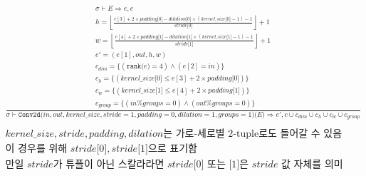 \documentclass{article}
\newcommand{\x}{\times}
\newcommand{\rem}{\mtt{\%}}
\newcommand{\Rar}{\Rightarrow}
\newcommand{\mtt}[1]{\mathtt{#1}}
\newcommand{\op}[2]{\mtt{#1(}#2\mtt{)}}
\newcommand{\module}[3]{\mtt{#1(}#2\mtt{)(}#3\mtt{)}}
\newcommand{\ind}[1]{\mtt{[}#1\mtt{]}}
\begin{document}
\begin{align*}
  \frac
  {
    \begin{array}{l}
      \sigma \vdash E \Rar e, c \\
      h = \left\lfloor \frac{e[3] + 2 \x padding \ind{0} - dilation \ind{0}
        \x (kernel\_size \ind{0} - 1) - 1}{stride \ind{0}} \right\rfloor + 1 \\
      w = \left\lfloor \frac{e[4] + 2 \x padding \ind{1} - dilation \ind{1}
        \x (kernel\_size \ind{1} - 1) - 1}{stride \ind{1}} \right\rfloor + 1 \\
      e' = (e[1], out, h, w) \\
      c_{dim} = \{ (\op{rank}{e} = 4) \land (e[2] = in) \} \\
      c_h = \{ (kernel\_size\ind{0} \leq e[3] + 2 \x padding \ind{0}) \} \\
      c_w = \{ (kernel\_size\ind{1} \leq e[4] + 2 \x padding \ind{1}) \} \\
      c_{group} = \{ (in \rem groups = 0) \land (out \rem groups = 0) \}
    \end{array}
  }
  {
    \sigma \vdash \module{Conv2d}{in, out, kernel\_size, stride=1, padding=0,
      dilation=1, groups=1}{E} \Rar e', c \cup c_{dim} \cup c_h \cup c_w \cup
      c_{group}
  } \\
  \\
  \text{$kernel\_size, stride, padding, dilation$는 가로-세로별 2-tuple로도 들어갈
  수 있음} \\
  \text{이 경우를 위해 $stride\ind{0}, stride\ind{1}$으로 표기함} \\
  \text{만일 $stride$가 튜플이 아닌 스칼라라면 $stride\ind{0}$ 또는 $\ind{1}$은
    $stride$ 값 자체를 의미}
\end{align*}
\end{document}
